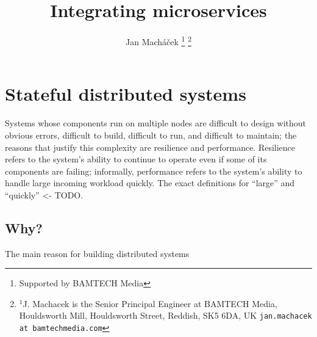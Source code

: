 \documentclass[10 pt, twocolumn]{article}
\title{Integrating microservices}
\author{Jan Mach{\'a}\v{c}ek%
\thanks{Supported by BAMTECH Media}%
\thanks{$^{1}$J. Machacek is the Senior Principal Engineer at BAMTECH Media, Houldsworth Mill, Houldsworth Street, Reddish, SK5 6DA, UK {\tt\small jan.machacek at bamtechmedia.com}}%
}
\begin{document}

\section{Stateful distributed systems}
Systems whose components run on multiple nodes are difficult to design without obvious errors, difficult to build, difficult to run, and difficult to maintain; the reasons that justify this complexity are resilience and performance. Resilience refers to the system's ability to continue to operate even if some of its components are failing; informally, performance refers to the system's ability to handle large incoming workload quickly. The exact definitions for ``large'' and ``quickly'' <- TODO.

\subsection{Why?}
The main reason for building distributed systems
\end{document}
